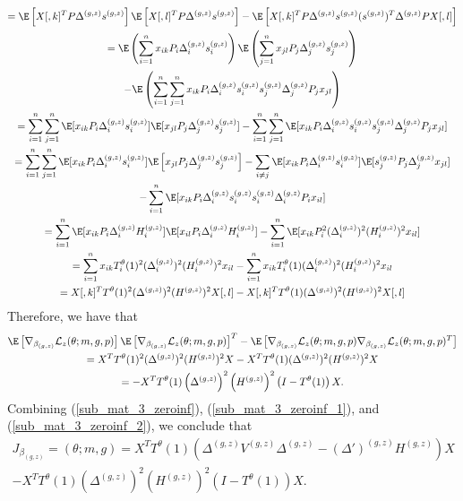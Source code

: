 \documentclass[12pt]{article}
\begin{document}
\begin{appendices}
\begin{multline*}
= \E\left[{X}[,k]^T P \Delta^{(g,z)} s^{(g,z)} \right] \E \left[ {X}[,l]^T P \Delta^{(g,z)} s^{(g,z)} \right] - \E \left[ {X}[,k]^T P \Delta^{(g,z)} s^{(g,z)} (s^{(g,z)})^T \Delta^{(g,z)} P {X}[,l ] \right] \\
=\E\left(\sum_{i=1}^n {x}_{ik} P_i \Delta^{(g,z)}_i s^{(g,z)}_{i} \right) \E \left( \sum_{j=1}^n {x}_{jl} P_j \Delta^{(g,z)}_j s^{(g,z)}_j \right) \\ - \E \left( \sum_{i=1}^n \sum_{j=1}^n {x}_{ik} P_i \Delta^{(g,z)}_i s^{(g,z)}_i s^{(g,z)}_j \Delta^{(g,z)}_j P_j{x}_{jl} \right) \\ 
= \sum_{i=1}^n \sum_{j=1}^n \E[ {x}_{ik} P_i \Delta^{(g,z)}_is^{(g,z)}_i] \E [ {x}_{jl} P_j \Delta^{(g,z)}_j s^{(g,z)}_j]  -  \sum_{i=1}^n \sum_{j=1}^n \E [ {x}_{ik} P_i \Delta^{(g,z)}_i s^{(g,z)}_i s^{(g,z)}_j \Delta^{(g,z)}_jP_j {x}_{jl}  ]  \\
= \sum_{i=1}^n \sum_{j=1}^n \E[ {x}_{ik} P_i \Delta^{(g,z)}_i s^{(g,z)}_i ] \E \left[{x}_{jl} P_j \Delta^{(g,z)}_j s^{(g,z)}_j \right]  - \sum_{i \neq j} \E [{x}_{ik} P_i \Delta^{(g,z)}_i s^{(g,z)}_i] \E[s^{(g,z)}_j P_j \Delta^{(g,z)}_j {x}_{jl}] \\ - \sum_{i=1}^n \E[ {x}_{ik}P_i \Delta^{(g,z)}_i s^{(g,z)}_i s^{(g,z)}_i \Delta^{(g,z)}_i P_i{x}_{il}] \\ 
= \sum_{i=1}^n \E[ {x}_{ik} P_i \Delta^{(g,z)}_i H^{(g,z)}_i] \E[{x}_{il}P_i\Delta^{(g,z)}_i H^{(g,z)}_i] - \sum_{i=1}^n \E[{x}_{ik}P_i^2(\Delta^{(g,z)}_i)^2 (H^{(g,z)}_i)^2 {x}_{il}] \\ = \sum_{i=1}^n {x}_{ik} T_i^{\theta}(1)^2(\Delta^{(g,z)}_i)^2 (H_i^{(g,z)})^2{x}_{il} - \sum_{i=1}^n {x}_{ik} T_i^{\theta}(1) (\Delta_i^{(g,z)})^2 (H_i^{(g,z)})^2 {x}_{il} \\ = {X}[,k]^T T^{\theta}(1)^2 (\Delta^{(g,z)})^2 (H^{(g,z)})^2 {X}[,l] - {X}[,k]^T T^{\theta}(1) (\Delta^{(g,z)})^2 (H^{(g,z)})^2 {X}[,l]
\end{multline*}
Therefore, we have that
\begin{multline}\label{sub_mat_3_zeroinf_2}
\E\left[ \nabla_{\beta_{(g,z)}} \mathcal{L}_z(\theta; m, g, p) \right] \E\left[\nabla_{\beta_{(g,z)}} \mathcal{L}_z(\theta; m, g, p) \right]^T - \E\left[ \nabla_{\beta_{(g,z)}} \mathcal{L}_z(\theta; m, g, p) \nabla_{\beta_{(g,z)}} \mathcal{L}_z(\theta; m, g, p)^T \right] \\ = 
X^T T^{\theta}(1)^2 (\Delta^{(g,z)})^2(H^{(g,z)})^2{X} - {X}^T T^{\theta}(1) (\Delta^{(g,z)})^2 (H^{(g,z)})^2 {X} \\ = - X^T T^{\theta}(1) \left(\Delta^{(g,z)}\right)^2 \left( H^{(g,z)} \right)^2 \left( I - T^{\theta}(1)  \right) X.
\end{multline}
Combining (\ref{sub_mat_3_zeroinf}), (\ref{sub_mat_3_zeroinf_1}), and (\ref{sub_mat_3_zeroinf_2}), we conclude that
\begin{multline}\label{sub_mat_3_zeroinf_formula}
J_{\beta_{(g, z)}} = \left( \theta; m, g \right) =  X^T T^{\theta}(1) ( \Delta^{(g,z)}V^{(g,z)}\Delta^{(g,z)} - (\Delta')^{(g,z)} H^{(g,z)}) X \\ - X^T T^{\theta}(1) \left(\Delta^{(g,z)}\right)^2 \left( H^{(g,z)} \right)^2 \left( I - T^{\theta}(1) \right) X.
\end{multline}


\end{appendices}
\end{document}
